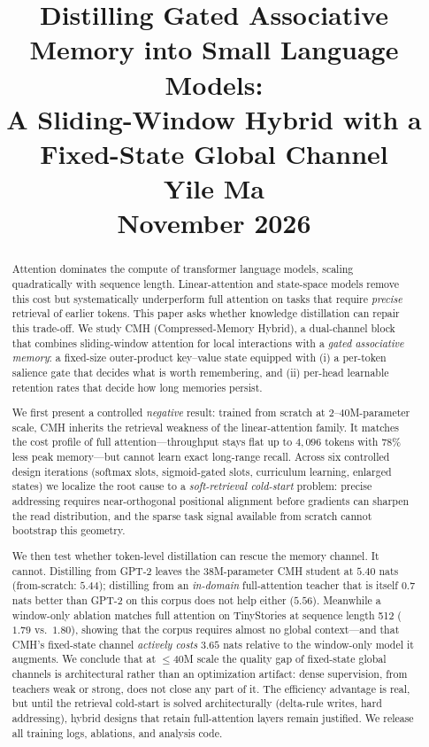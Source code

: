 \documentclass[11pt]{article}
\title{\textbf{Distilling Gated Associative Memory into Small Language Models:\\
A Sliding-Window Hybrid with a Fixed-State Global Channel}\\[0.6em]
\large Yile Ma\\[0.2em]
\normalsize November 2026}
\date{}
\newcommand{\cmh}{CMH}
\begin{document}
\maketitle

\begin{abstract}
Attention dominates the compute of transformer language models, scaling quadratically
with sequence length. Linear-attention and state-space models remove this cost but
systematically underperform full attention on tasks that require \emph{precise}
retrieval of earlier tokens. This paper asks whether knowledge distillation can repair
this trade-off. We study \cmh{} (Compressed-Memory Hybrid), a dual-channel block that
combines sliding-window attention for local interactions with a \emph{gated associative
memory}: a fixed-size outer-product key--value state equipped with (i) a per-token
salience gate that decides what is worth remembering, and (ii) per-head learnable
retention rates that decide how long memories persist.

We first present a controlled \emph{negative} result: trained from scratch at
2--40M-parameter scale, \cmh{} inherits the retrieval weakness of the linear-attention
family. It matches the cost profile of full attention---throughput stays flat up to
$4{,}096$ tokens with $78\%$ less peak memory---but cannot learn exact long-range
recall. Across six controlled design iterations (softmax slots, sigmoid-gated slots,
curriculum learning, enlarged states) we localize the root cause to a
\emph{soft-retrieval cold-start} problem: precise addressing requires near-orthogonal
positional alignment before gradients can sharpen the read distribution, and the sparse
task signal available from scratch cannot bootstrap this geometry.

We then test whether token-level distillation can rescue the memory channel. It cannot.
Distilling from GPT-2 leaves the 38M-parameter \cmh{} student at $5.40$ nats (from-scratch:
$5.44$); distilling from an \emph{in-domain} full-attention teacher that is itself $0.7$
nats better than GPT-2 on this corpus does not help either ($5.56$). Meanwhile a
window-only ablation matches full attention on TinyStories at sequence length 512
($1.79$ vs.\ $1.80$), showing that the corpus requires almost no global context---and that
\cmh{}'s fixed-state channel \emph{actively costs} $3.65$ nats relative to the
window-only model it augments. We conclude that at $\le$40M scale the quality gap of
fixed-state global channels is architectural rather than an optimization artifact: dense
supervision, from teachers weak or strong, does not close any part of it. The efficiency
advantage is real, but until the retrieval cold-start is solved architecturally
(delta-rule writes, hard addressing), hybrid designs that retain full-attention layers
remain justified. We release all training logs, ablations, and analysis code.
\end{abstract}
\end{document}
